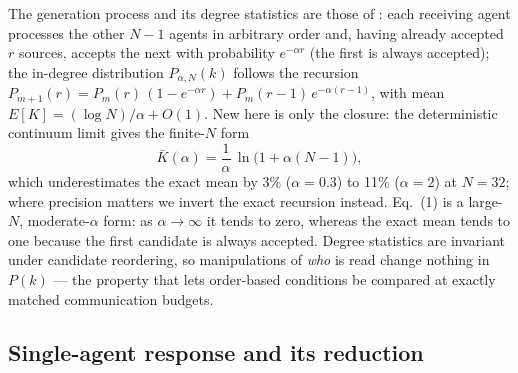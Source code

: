\documentclass[9pt,twocolumn]{extarticle}
\begin{document}
The generation process and its degree statistics are those of
\citet{SciRepCrowding}: each receiving agent processes the other $N-1$
agents in arbitrary order and, having already accepted $r$ sources, accepts
the next with probability $e^{-\alpha r}$ (the first is always accepted);
the in-degree distribution $P_{\alpha,N}(k)$ follows the recursion
$P_{m+1}(r) = P_m(r)\,(1-e^{-\alpha r}) + P_m(r-1)\,e^{-\alpha (r-1)}$,
with mean $E[K] = (\log N)/\alpha + O(1)$. New here is only the closure:
the deterministic continuum limit gives the finite-$N$ form
\begin{equation}
\bar K(\alpha) = \frac{1}{\alpha}\,\ln\!\bigl(1 + \alpha (N-1)\bigr),
\end{equation}
which underestimates the exact mean by 3\% ($\alpha = 0.3$) to 11\%
($\alpha = 2$) at $N = 32$; where precision matters we invert the exact
recursion instead. Eq.~(1) is a large-$N$, moderate-$\alpha$ form: as
$\alpha \to \infty$ it tends to zero, whereas the exact mean tends to one
because the first candidate is always accepted. Degree statistics are invariant under candidate reordering,
so manipulations of \emph{who} is read change nothing in $P(k)$ --- the
property that lets order-based conditions be compared at exactly matched
communication budgets.

\subsection{Single-agent response and its reduction}
\end{document}
